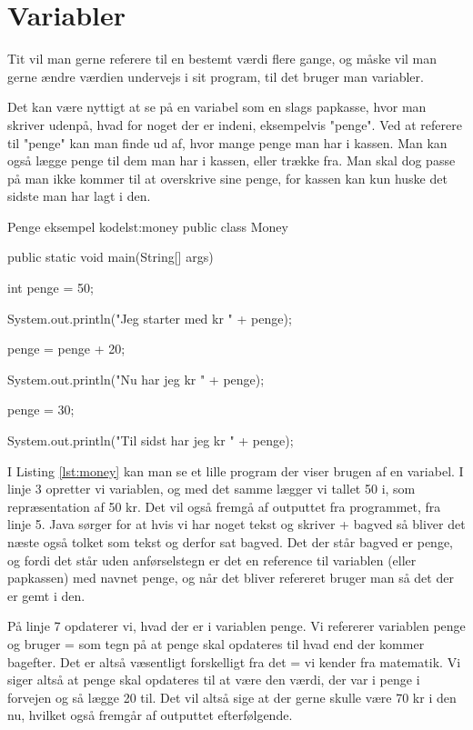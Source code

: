 \section{Variabler}
Tit vil man gerne referere til en bestemt værdi flere gange, og måske vil man gerne ændre værdien undervejs i sit program, til det bruger man variabler. 

Det kan være nyttigt at se på en variabel som en slags papkasse, hvor man skriver udenpå, hvad for noget der er indeni, eksempelvis "penge". Ved at referere til "penge" kan man finde ud af, hvor mange penge man har i kassen. Man kan også lægge penge til dem man har i kassen, eller trække fra. Man skal dog passe på man ikke kommer til at overskrive sine penge, for kassen kan kun huske det sidste man har lagt i den.

\begin{JavaCode}{Penge eksempel kode}{lst:money}
	public class Money {
		public static void main(String[] args) {
			int penge = 50;
			
			System.out.println("Jeg starter med kr " + penge);
			
			penge = penge + 20;
			
			System.out.println("Nu har jeg kr " + penge);
			
			penge = 30;
			
			System.out.println("Til sidst har jeg kr " + penge);
		}
	}
\end{JavaCode}

I Listing \ref{lst:money} kan man se et lille program der viser brugen af en variabel. I linje 3 opretter vi variablen, og med det samme lægger vi tallet 50 i, som repræsentation af 50 kr. Det vil også fremgå af outputtet fra programmet, fra linje 5. Java sørger for at hvis vi har noget tekst og skriver + bagved så bliver det næste også tolket som tekst og derfor sat bagved. Det der står bagved er penge, og fordi det står uden anførselstegn er det en reference til variablen (eller papkassen) med navnet penge, og når det bliver refereret bruger man så det der er gemt i den.

På linje 7 opdaterer vi, hvad der er i variablen penge. Vi refererer variablen penge og bruger = som tegn på at penge skal opdateres til hvad end der kommer bagefter. Det er altså væsentligt forskelligt fra det = vi kender fra matematik. Vi siger altså at penge skal opdateres til at være den værdi, der var i penge i forvejen og så lægge 20 til. Det vil altså sige at der gerne skulle være 70 kr i den nu, hvilket også fremgår af outputtet efterfølgende.

